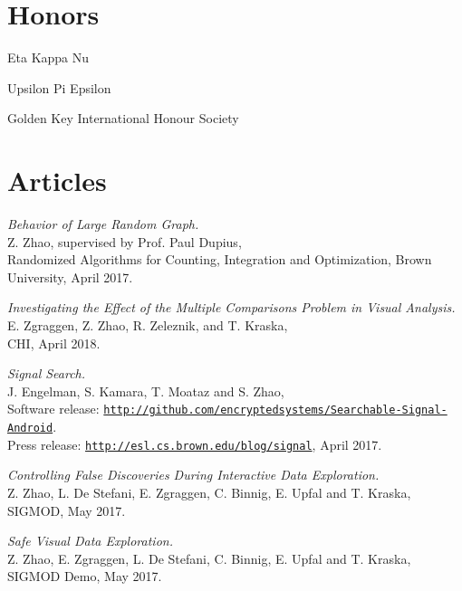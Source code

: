 \documentclass[letterpaper]{article}
\renewenvironment{itemize}{
  \begin{list}{}{
    \setlength{\leftmargin}{1.5em}
  }
}{
  \end{list}
}
\begin{document}
\section*{Honors}
\begin{itemize}
\item Eta Kappa Nu
\item Upsilon Pi Epsilon
\item Golden Key International Honour Society
\end{itemize}

\section*{Articles}

\begin{itemize}

\item \textit{Behavior of Large Random Graph.}\\
  Z. Zhao, supervised by Prof. Paul Dupius, \\
  Randomized Algorithms for Counting, Integration and Optimization, Brown University, April 2017.

\item \textit{Investigating the Effect of the Multiple Comparisons Problem in Visual Analysis.} \\
  E. Zgraggen, Z. Zhao, R. Zeleznik, and T. Kraska, \\
  CHI, April 2018.

\item \textit{Signal Search.} \\
  J. Engelman, S. Kamara, T. Moataz and S. Zhao, \\
  Software release: \href{http://github.com/encryptedsystems/Searchable-Signal-Android}{\tt http://github.com/encryptedsystems/Searchable-Signal-Android}. \\
  Press release: \href{http://esl.cs.brown.edu/blog/signal}{\tt http://esl.cs.brown.edu/blog/signal}, April 2017.

\item \textit{Controlling False Discoveries During Interactive Data Exploration.} \\
  Z. Zhao, L. De Stefani, E. Zgraggen, C. Binnig, E. Upfal and T. Kraska, \\
  SIGMOD, May 2017.

\item \textit{Safe Visual Data Exploration.} \\
  Z. Zhao, E. Zgraggen, L. De Stefani, C. Binnig, E. Upfal and T. Kraska, \\
  SIGMOD Demo, May 2017.


\end{itemize}
\end{document}
